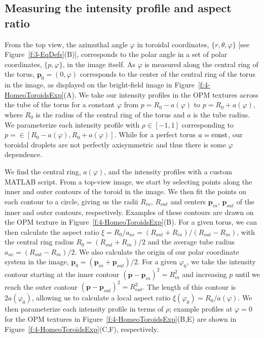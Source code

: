 \subsection{Measuring the intensity profile and aspect ratio}
From the top view, the azimuthal angle $\varphi$ in toroidal coordinates, $\{r,\theta,\varphi \}$ [see Figure~\ref{f:3-EqDefs}(B)], corresponds to the polar angle in a set of polar coordinates, $\{p,\varphi \}$, in the image itself.
As $\varphi$ is measured along the central ring of the torus, $\mathbf{p}_0 = (0,\varphi)$ corresponds to the center of the central ring of the torus in the image, as displayed on the bright-field image in Figure~\ref{f:4-HomeoToroidsExp}(A).
We take our intensity profiles in the OPM textures across the tube of the torus for a constant $\varphi$ from $p = R_0 - a(\varphi)$ to $p = R_0+ a(\varphi)$, where $R_0$ is the radius of the central ring of the torus and $a$ is the tube radius.
We parameterize each intensity profile with $\rho \in [-1,1]$ corresponding to $p = \in [R_0 - a(\varphi),R_0 + a(\varphi)]$.
While for a perfect torus $a = {\rm const}$, our toroidal droplets are not perfectly axisymmetric and thus there is some $\varphi$ dependence.

We find the central ring, $a(\varphi)$, and the intensity profiles with a custom MATLAB script.
From a top-view image, we start by selecting points along the inner and outer contours of the toroid in the image.
We then fit the points on each contour to a circle, giving us the radii $R_{in}$, $R_{out}$ and centers $\mathbf{p}_{in}$, $\mathbf{p}_{out}$ of the inner and outer contours, respectively.
Examples of these contours are drawn on the OPM texture in Figure~\ref{f:4-HomeoToroidsExp}(B).
For a given torus, we can then calculate the aspect ratio $\xi = R_0/a_{av} = (R_{out}+R_{in})/(R_{out}-R_{in})$, with the central ring radius $R_0=(R_{out}+R_{in})/2$ and the average tube radius $a_{av} = (R_{out}-R_{in})/2$.
We also calculate the origin of our polar coordinate system in the image, $\mathbf{p}_0 = (\mathbf{p}_{in}+\mathbf{p}_{out})/2$.
For a given $\varphi_0$, we take the intensity contour starting at the inner contour $(\mathbf{p}-\mathbf{p}_{in})^2 = R^2_{in}$ and increasing $p$ until we reach the outer contour $(\mathbf{p}-\mathbf{p}_{out})^2 = R^2_{out}$.
The length of this contour is $2 a(\varphi_0)$, allowing us to calculate a local aspect ratio $\xi(\varphi_0) = R_0/a(\varphi)$.
We then parameterize each intensity profile in terms of $\rho$; example profiles at $\varphi = 0$ for the OPM textures  in Figure~\ref{f:4-HomeoToroidsExp}(B,E) are shown in Figure~\ref{f:4-HomeoToroidsExp}(C,F), respectively.


